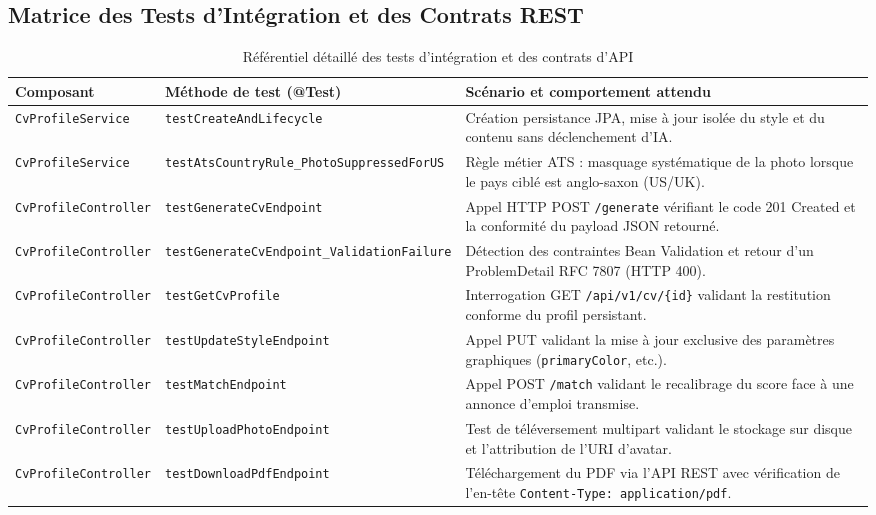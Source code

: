 \documentclass[11pt,a4paper]{article}
\begin{document}
\subsection{Matrice des Tests d'Intégration et des Contrats REST}

\begin{table}[h!]
\centering
\small
\renewcommand{\arraystretch}{1.2}
\begin{tabularx}{\textwidth}{|l|l|X|}
\hline
\rowcolor{headergray}
\textbf{Composant} & \textbf{Méthode de test (@Test)} & \textbf{Scénario et comportement attendu} \\
\hline
\texttt{CvProfileService} & \texttt{testCreateAndLifecycle} & Création persistance JPA, mise à jour isolée du style et du contenu sans déclenchement d'IA. \\
\hline
\texttt{CvProfileService} & \texttt{testAtsCountryRule\_PhotoSuppressedForUS} & Règle métier ATS : masquage systématique de la photo lorsque le pays ciblé est anglo-saxon (US/UK). \\
\hline
\texttt{CvProfileController} & \texttt{testGenerateCvEndpoint} & Appel HTTP POST \texttt{/generate} vérifiant le code 201 Created et la conformité du payload JSON retourné. \\
\hline
\texttt{CvProfileController} & \texttt{testGenerateCvEndpoint\_ValidationFailure} & Détection des contraintes Bean Validation et retour d'un ProblemDetail RFC 7807 (HTTP 400). \\
\hline
\texttt{CvProfileController} & \texttt{testGetCvProfile} & Interrogation GET \texttt{/api/v1/cv/\{id\}} validant la restitution conforme du profil persistant. \\
\hline
\texttt{CvProfileController} & \texttt{testUpdateStyleEndpoint} & Appel PUT validant la mise à jour exclusive des paramètres graphiques (\texttt{primaryColor}, etc.). \\
\hline
\texttt{CvProfileController} & \texttt{testMatchEndpoint} & Appel POST \texttt{/match} validant le recalibrage du score face à une annonce d'emploi transmise. \\
\hline
\texttt{CvProfileController} & \texttt{testUploadPhotoEndpoint} & Test de téléversement multipart validant le stockage sur disque et l'attribution de l'URI d'avatar. \\
\hline
\texttt{CvProfileController} & \texttt{testDownloadPdfEndpoint} & Téléchargement du PDF via l'API REST avec vérification de l'en-tête \texttt{Content-Type: application/pdf}. \\
\hline
\end{tabularx}
\caption{Référentiel détaillé des tests d'intégration et des contrats d'API}
\end{table}
\end{document}
